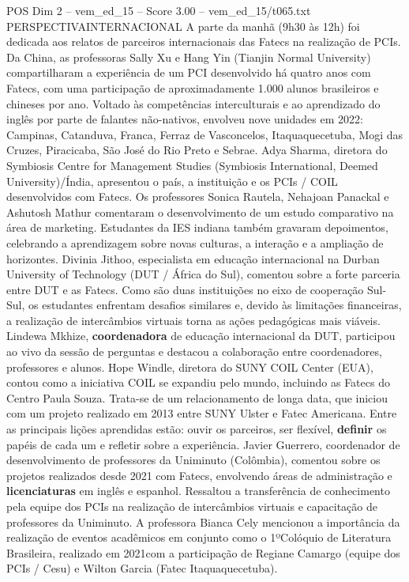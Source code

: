 \begin{textsample}{POS Dim 2 – vem\_ed\_15 – Score 3.00 – vem\_ed\_15/t065.txt}  \label{ex:f2_pos_163}
PERSPECTIVAINTERNACIONAL A parte da manhã (9h30 às 12h) foi dedicada aos relatos de parceiros internacionais das Fatecs na realização de PCIs.
Da China, as professoras Sally Xu e Hang Yin (Tianjin Normal University) compartilharam a experiência de um PCI desenvolvido há quatro anos com Fatecs, com uma participação de aproximadamente 1.000 alunos brasileiros e chineses por ano.
Voltado às competências interculturais e ao aprendizado do inglês por parte de falantes não-nativos, envolveu nove unidades em 2022: Campinas, Catanduva, Franca, Ferraz de Vasconcelos, Itaquaquecetuba, Mogi das Cruzes, Piracicaba, São José do Rio Preto e Sebrae.
Adya Sharma, diretora do Symbiosis Centre for Management Studies (Symbiosis International, Deemed University)/Índia, apresentou o país, a instituição e os PCIs / COIL desenvolvidos com Fatecs.
Os professores Sonica Rautela, Nehajoan Panackal e Ashutosh Mathur comentaram o desenvolvimento de um estudo comparativo na área de marketing.
Estudantes da IES indiana também gravaram depoimentos, celebrando a aprendizagem sobre novas culturas, a interação e a ampliação de horizontes.
Divinia Jithoo, especialista em educação internacional na Durban University of Technology (DUT / África do Sul), comentou sobre a forte parceria entre DUT e as Fatecs.
Como são duas instituições no eixo de cooperação Sul-Sul, os estudantes enfrentam desafios similares e, devido às limitações financeiras, a realização de intercâmbios virtuais torna as ações pedagógicas mais viáveis.
Lindewa Mkhize, \textbf{coordenadora} de educação internacional da DUT, participou ao vivo da sessão de perguntas e destacou a colaboração entre coordenadores, professores e alunos.
Hope Windle, diretora do SUNY COIL Center (EUA), contou como a iniciativa COIL se expandiu pelo mundo, incluindo as Fatecs do Centro Paula Souza.
Trata-se de um relacionamento de longa data, que iniciou com um projeto realizado em 2013 entre SUNY Ulster e Fatec Americana.
Entre as principais lições aprendidas estão: ouvir os parceiros, ser flexível, \textbf{definir} os papéis de cada um e refletir sobre a experiência.
Javier Guerrero, coordenador de desenvolvimento de professores da Uniminuto (Colômbia), comentou sobre os projetos realizados desde 2021 com Fatecs, envolvendo áreas de administração e \textbf{licenciaturas} em inglês e espanhol.
Ressaltou a transferência de conhecimento pela equipe dos PCIs na realização de intercâmbios virtuais e capacitação de professores da Uniminuto.
A professora Bianca Cely mencionou a importância da realização de eventos acadêmicos em conjunto como o 1ºColóquio de Literatura Brasileira, realizado em 2021com a participação de Regiane Camargo (equipe dos PCIs / Cesu) e Wilton Garcia (Fatec Itaquaquecetuba).

\end{textsample}
